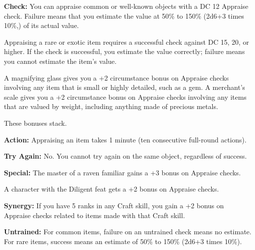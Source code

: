 \textbf{Check:} You can appraise common or well-known objects with a DC 12 Appraise check. Failure means that you estimate the value at 50\% to 150\% (2d6+3 times 10\%,) of its actual value.

Appraising a rare or exotic item requires a successful check against DC 15, 20, or higher. If the check is successful, you estimate the value correctly; failure means you cannot estimate the item’s value.

A magnifying glass gives you a +2 circumstance bonus on Appraise checks involving any item that is small or highly detailed, such as a gem. A merchant’s scale gives you a +2 circumstance bonus on Appraise checks involving any items that are valued by weight, including anything made of precious metals.

These bonuses stack.

\textbf{Action:} Appraising an item takes 1 minute (ten consecutive full-round actions).

\textbf{Try Again:} No. You cannot try again on the same object, regardless of success.

\textbf{Special:} The master of a raven familiar gains a +3 bonus on Appraise checks.

A character with the Diligent feat gets a +2 bonus on Appraise checks.

\textbf{Synergy:} If you have 5 ranks in any Craft skill, you gain a +2 bonus on Appraise checks related to items made with that Craft skill.

\textbf{Untrained:} For common items, failure on an untrained check means no estimate. For rare items, success means an estimate of 50\% to 150\% (2d6+3 times 10\%).